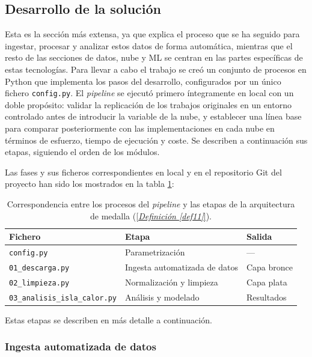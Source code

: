 \subsection{Desarrollo de la solución} \label{sec:Metodos_desarrollo}

Esta es la sección más extensa, ya que explica el proceso que se ha seguido para ingestar, procesar y analizar estos datos de forma automática, mientras que el resto de las secciones de datos, nube y ML se centran en las partes específicas de estas tecnologías. Para llevar a cabo el trabajo se creó un conjunto de procesos en Python que implementa los pasos del desarrollo, configurados por un único fichero \texttt{config.py}. El \textit{pipeline} se ejecutó primero íntegramente en local con un doble propósito: validar la replicación de los trabajos originales en un entorno controlado antes de introducir la variable de la nube, y establecer una línea base para comparar posteriormente con las implementaciones en cada nube en términos de esfuerzo, tiempo de ejecución y coste. Se describen a continuación sus etapas, siguiendo el orden de los módulos.

Las fases y sus ficheros correspondientes en local y en el repositorio Git del proyecto han sido los mostrados en la tabla \ref{tab:ficheros_pipeline}:

\begin{table}[htbp]
	\centering
	\small
	\begin{tabular}{lll}
		\hline
		\textbf{Fichero} & \textbf{Etapa} & \textbf{Salida} \\
		\hline
		\texttt{config.py} & Parametrización & --- \\
		\texttt{01\_descarga.py} & Ingesta automatizada de datos & Capa bronce \\
		\texttt{02\_limpieza.py} & Normalización y limpieza & Capa plata \\
		\texttt{03\_analisis\_isla\_calor.py} & Análisis y modelado & Resultados \\
		\hline
	\end{tabular}
	\caption{Correspondencia entre los procesos del \textit{pipeline} y las etapas de la arquitectura de medalla (\hyperref[def11]{[\textit{Definición \ref*{def11}}]}).}
	\label{tab:ficheros_pipeline}
\end{table}

Estas etapas se describen en más detalle a continuación.

\subsubsection{Ingesta automatizada de datos} \label{sec:Metodos_ingesta}

